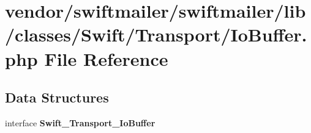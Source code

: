 \section{vendor/swiftmailer/swiftmailer/lib/classes/\+Swift/\+Transport/\+Io\+Buffer.php File Reference}
\label{_io_buffer_8php}
\subsection*{Data Structures}
\begin{DoxyCompactItemize}
\item 
interface {\bf Swift\+\_\+\+Transport\+\_\+\+Io\+Buffer}
\end{DoxyCompactItemize}
